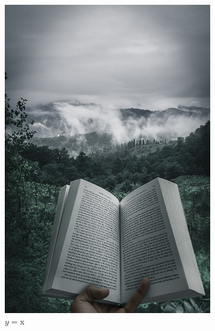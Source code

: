 \begin{figure}[!t]
\begin{subfigure}[b]{0.3\textwidth}
        \includegraphics[width=\textwidth]{images/f}
        \caption{$y=$x}
        \label{fig:wave1}
    \end{subfigure}
    \hfill
    \begin{subfigure}[b]{0.3\textwidth}
        \centering

\end{subfigure}
\end{figure}

